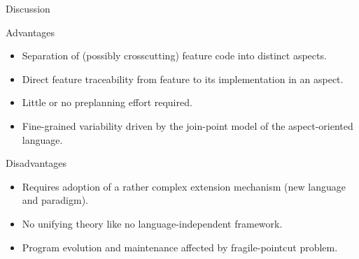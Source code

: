 \begin{frame}{Discussion}
	\begin{mycolumns}[widths={50,50},animation=none]
		\begin{note}{Advantages}
			\begin{itemize}
				\item Separation of (possibly crosscutting) feature code into distinct aspects.
				\item Direct feature traceability from feature to its implementation in an aspect.
				\item Little or no preplanning effort required.
				\item Fine-grained variability driven by the join-point model of the aspect-oriented language.
			\end{itemize}
		\end{note}
	\mynextcolumn
		\pause
		\begin{note}{Disadvantages}
			\begin{itemize}
				\item Requires adoption of a rather complex extension mechanism (new language and paradigm).
				\item No unifying theory like no language-independent framework.
				\item Program evolution and maintenance affected by fragile-pointcut problem.
			\end{itemize}
		\end{note}
	\end{mycolumns}
\end{frame}